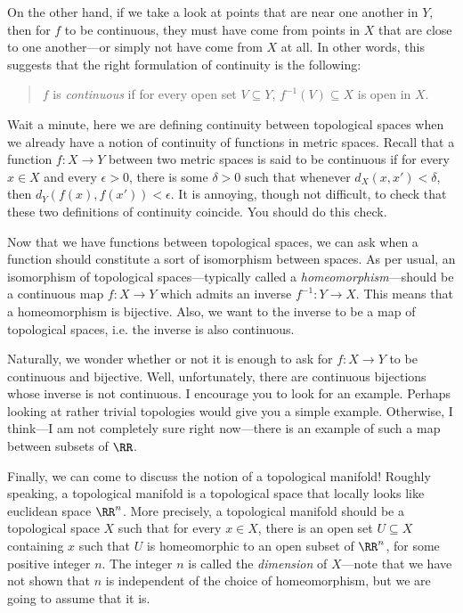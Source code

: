 \documentclass{axolotl}
\begin{document}
On the other hand, if we take a look at points that are near one another in
\(Y\), then for \(f\) to be continuous, they must have come from points in
\(X\) that are close to one another---or simply not have come from \(X\) at
all. In other words, this suggests that the right formulation of continuity
is the following:
\begin{quote}
  \(f\) is \textit{continuous} if for every open set \(V \subseteq Y\), \(f^{-1}(V)
    \subseteq X\) is open in \(X\).
\end{quote}
Wait a minute, here we are defining continuity between topological spaces when
we already have a notion of continuity of functions in metric spaces. Recall
that a function \(f: X \to Y\) between two metric spaces is said to be
continuous if for every \(x \in X\) and every \(\epsilon > 0\), there is some
\(\delta > 0\) such that whenever \(d_X(x,x') < \delta\), then
\(d_Y(f(x),f(x')) < \epsilon\). It is annoying, though not difficult, to check
that these two definitions of continuity coincide. You should do this check.

Now that we have functions between topological spaces, we can ask when a function
should constitute a sort of isomorphism between spaces. As per usual, an isomorphism
of topological spaces---typically called a \textit{homeomorphism}---should be a
continuous map \(f: X \to Y\) which admits an inverse \(f^{-1}: Y \to X\). This
means that a homeomorphism is bijective. Also, we want to the inverse to be a map
of topological spaces, i.e. the inverse is also continuous.

Naturally, we wonder whether or not it is enough to ask for \(f: X \to Y\) to
be continuous and bijective. Well, unfortunately, there are continuous
bijections whose inverse is not continuous. I encourage you to look for an
example. Perhaps looking at rather trivial topologies would give you a simple
example. Otherwise, I think---I am not completely sure right now---there is an
example of such a map between subsets of \(\RR\).

Finally, we can come to discuss the notion of a topological manifold! Roughly
speaking, a topological manifold is a topological space that locally looks like
euclidean space \(\RR^n\). More precisely, a topological manifold should be a
topological space \(X\) such that for every \(x \in X\), there is an open set
\(U \subseteq X\) containing \(x\) such that \(U\) is homeomorphic to an open
subset of \(\RR^n\), for some positive integer \(n\). The integer \(n\) is
called the \textit{dimension} of \(X\)---note that we have not shown that \(n\)
is independent of the choice of homeomorphism, but we are going to assume that
it is.
\end{document}
